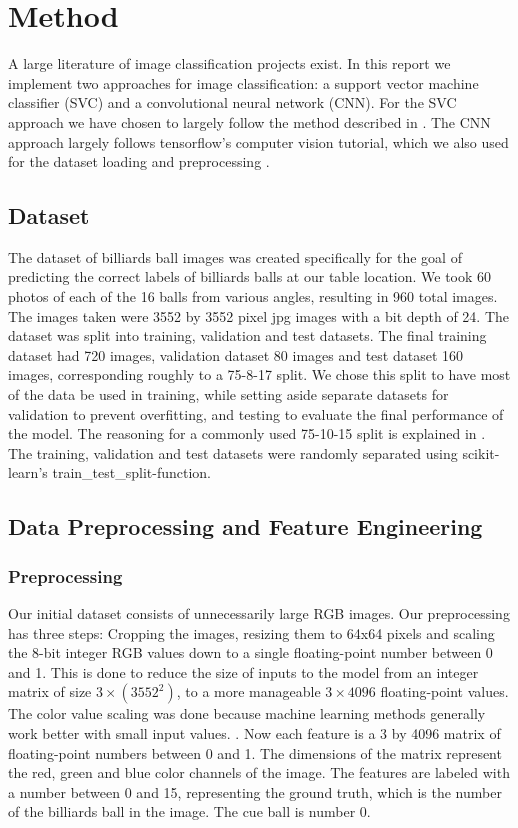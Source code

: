 \documentclass{article}
\begin{document}
\section{Method}
\label{sec:method}
A large literature of image classification projects exist. In this report we implement two approaches for image classification: a support vector machine classifier (SVC) and a convolutional neural network (CNN). For the SVC approach we have chosen to largely follow the method described in \cite{unknownMachineLearningApproach2023}. The CNN approach largely follows tensorflow's computer vision tutorial, which we also used for the dataset loading and preprocessing \cite{ComputerVisionTensorFlow}.

\subsection{Dataset}
\label{sec:dataset}
The dataset of billiards ball images was created specifically for the goal of predicting the correct labels of billiards balls at our table location. We took 60 photos of each of the 16 balls from various angles, resulting in 960 total images. The images taken were 3552 by 3552 pixel jpg images with a bit depth of 24. The dataset was split into training, validation and test datasets. The final training dataset had 720 images, validation dataset 80 images and test dataset 160 images, corresponding roughly to a 75-8-17 split. We chose this split to have most of the data be used in training, while setting aside separate datasets for validation to prevent overfitting, and testing to evaluate the final performance of the model. The reasoning for a commonly used 75-10-15 split is explained in \cite{josephOptimalRatioData2022}. The training, validation and test datasets were randomly separated using scikit-learn's train\_test\_split-function.

\subsection{Data Preprocessing and Feature Engineering}
\label{sec:data_preprocessing}
\subsubsection*{Preprocessing}
\label{sec:preprocessing}
Our initial dataset consists of unnecessarily large RGB images. Our preprocessing has three steps: Cropping the images, resizing them to 64x64 pixels and scaling the 8-bit integer RGB values down to a single floating-point number between 0 and 1. This is done to reduce the size of inputs to the model from an integer matrix of size $3\times(3552^2)$, to a more manageable $3\times 4096$ floating-point values. The color value scaling was done because machine learning methods generally work better with small input values. \cite{ImportanceFeatureScaling}. Now each feature is a 3 by 4096 matrix of floating-point numbers between 0 and 1. The dimensions of the matrix represent the red, green and blue color channels of the image. The features are labeled with a number between 0 and 15, representing the ground truth, which is the number of the billiards ball in the image. The cue ball is number 0.
\end{document}
